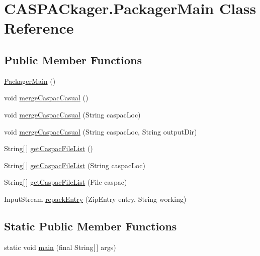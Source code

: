 \hypertarget{class_c_a_s_p_a_ckager_1_1_packager_main}{\section{C\-A\-S\-P\-A\-Ckager.\-Packager\-Main Class Reference}
\label{class_c_a_s_p_a_ckager_1_1_packager_main}
}
\subsection*{Public Member Functions}
\begin{DoxyCompactItemize}
\item 
\hyperlink{class_c_a_s_p_a_ckager_1_1_packager_main_a5feeab84510603114e4cd16af557183f}{Packager\-Main} ()
\item 
void \hyperlink{class_c_a_s_p_a_ckager_1_1_packager_main_a4e8e02f802540050d3f1a074a9f4b411}{merge\-Caspac\-Casual} ()
\item 
void \hyperlink{class_c_a_s_p_a_ckager_1_1_packager_main_a32df460e9180f81a54b7d7a3c38215cc}{merge\-Caspac\-Casual} (String caspac\-Loc)
\item 
void \hyperlink{class_c_a_s_p_a_ckager_1_1_packager_main_ab3e1a27e66331e67b19ae4809480f46a}{merge\-Caspac\-Casual} (String caspac\-Loc, String output\-Dir)
\item 
String\mbox{[}$\,$\mbox{]} \hyperlink{class_c_a_s_p_a_ckager_1_1_packager_main_afdf339fc0283b3cf6418de0e59732762}{get\-Caspac\-File\-List} ()
\item 
String\mbox{[}$\,$\mbox{]} \hyperlink{class_c_a_s_p_a_ckager_1_1_packager_main_ae9bf358f30038bfb45e7de7bf2c3c0a6}{get\-Caspac\-File\-List} (String caspac\-Loc)
\item 
String\mbox{[}$\,$\mbox{]} \hyperlink{class_c_a_s_p_a_ckager_1_1_packager_main_aa741699d712b8b9cecb5a6782838413d}{get\-Caspac\-File\-List} (File caspac)
\item 
Input\-Stream \hyperlink{class_c_a_s_p_a_ckager_1_1_packager_main_aac9b44ae631f522eb53efce869f3a5c5}{repack\-Entry} (Zip\-Entry entry, String working)
\end{DoxyCompactItemize}
\subsection*{Static Public Member Functions}
\begin{DoxyCompactItemize}
\item 
static void \hyperlink{class_c_a_s_p_a_ckager_1_1_packager_main_ab65464d17a9ed1557137ca0fc128f320}{main} (final String\mbox{[}$\,$\mbox{]} args)
\end{DoxyCompactItemize}
